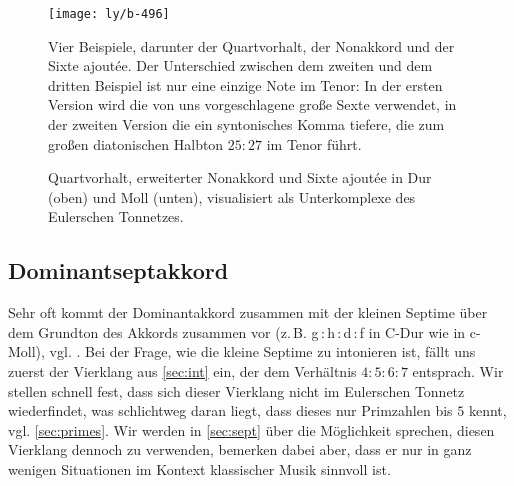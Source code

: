 
\begin{figure}
  \centering
  \texttt{[image: ly/b-496]}
  \caption{Vier Beispiele, darunter der Quartvorhalt, der Nonakkord und der
    Sixte ajoutée. Der Unterschied zwischen dem zweiten und dem dritten Beispiel
    ist nur eine einzige Note im Tenor: In der ersten Version wird die von uns
    vorgeschlagene große Sexte verwendet, in der zweiten Version die ein
    syntonisches Komma tiefere, die zum großen diatonischen Halbton $25:27$ im
    Tenor führt.}\label{fig:496}
\end{figure}

\begin{figure}
  \centering
  
  \caption{Quartvorhalt, erweiterter Nonakkord und Sixte ajoutée in Dur (oben)
    und Moll (unten), visualisiert als Unterkomplexe des Eulerschen
    Tonnetzes.}\label{fig:chordLines}
\end{figure}

\subsection{Dominantseptakkord}
\label{sec:dom7syn}

Sehr oft kommt der Dominantakkord zusammen mit der kleinen Septime über dem
Grundton des Akkords zusammen vor (z.\,B. g\,:\,h\,:\,d\,:\,f in C-Dur wie in
c-Moll), vgl. \cite[{}9.1]{Skript}.  Bei der Frage, wie die kleine Septime zu
intonieren ist, fällt uns zuerst der Vierklang aus \cref{sec:int} ein, der dem
Verhältnis $4:5:6:7$ entsprach. Wir stellen schnell fest, dass sich dieser
Vierklang nicht im Eulerschen Tonnetz wiederfindet, was schlichtweg daran liegt,
dass dieses nur Primzahlen bis $5$ kennt, vgl. \cref{sec:primes}.  Wir werden in
\cref{sec:sept} über die Möglichkeit sprechen, diesen Vierklang dennoch zu
verwenden, bemerken dabei aber, dass er nur in ganz wenigen Situationen im
Kontext klassischer Musik sinnvoll ist.

